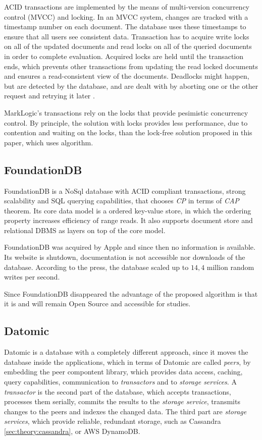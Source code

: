 ACID transactions are implemented by the means of multi-version concurrency control (MVCC) and locking. In an MVCC system, changes are tracked with a timestamp number on each document. 
The database uses these timestamps to ensure that all users see consistent data. 
Transaction has to acquire write locks on all of the updated documents and read locks on all of the queried documents in order to complete evaluation. Acquired locks are held until the transaction ends, which prevents other transactions from updating the read locked documents and ensures a read-consistent view of the documents. 
Deadlocks might happen, but are detected by the database, and are dealt with by aborting one or the other request and retrying it later \cite{markLogicUnderstandingTransactions}.

MarkLogic's transactions rely on the locks that provide pesimistic concurrency control.
By principle, the solution with locks provides less performance, due to contention and waiting on the locks, than the lock-free solution proposed in this paper, which uses \paxos algorithm.


\subsection{FoundationDB}
FoundationDB is a NoSql database with ACID compliant transactions, strong scalability and SQL querying capabilities, that chooses \emph{CP} in terms of \emph{CAP} theorem.
Its core data model is a ordered key-value store, in which the ordering property increases efficiency of range reads. It also supports document store and relational DBMS as layers on top of the core model. 

FoundationDB was acquired by Apple \cite{foundationDbAcquired} and since then no information is available. Its website is shutdown, documentation is not accessible nor downloads of the database. According to the press, the database scaled up to $14,4$ million random writes per second.

Since FoundationDB disappeared the advantage of the proposed algorithm is that it is and will remain Open Source and accessible for studies.

\subsection{Datomic}
Datomic \cite{datomic} is a database with a completely different approach, since it moves the database inside the applications, which in terms of Datomic are called \emph{peers}, by embedding the peer compontent library, which provides data access, caching, query capabilities, communication to \emph{transactors} and to \emph{storage services}. A \emph{transactor} is the second part of the database, which accepts transactions, processes them serially, commits the results to the \emph{storage service}, transmits changes to the peers and indexes the changed data. The third part are \emph{storage services}, which provide reliable, redundant storage, such as Cassandra \ref{sec:theory:cassandra}, or AWS DynamoDB.

